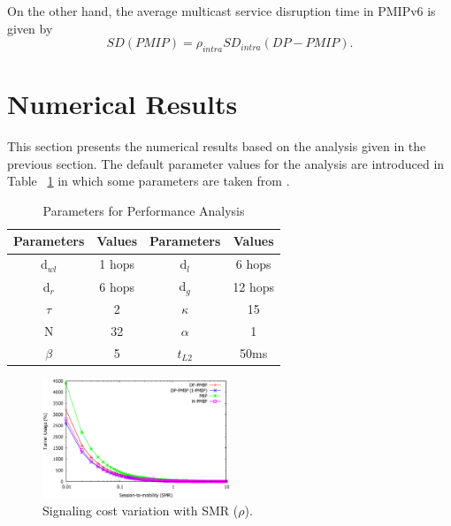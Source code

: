 On the other hand, the average multicast service disruption time in PMIPv6 is given by\\
\begin{equation}
SD(PMIP) = \rho_{intra} SD_{intra}(DP-PMIP). 
\end{equation}

\section{Numerical Results} \label{ch9:numerical_result}
This section presents the numerical results based on the analysis given in the previous section. The default parameter values for the analysis are introduced in Table ~\ref{tap:c9_parameters} in which some parameters are taken from \cite{HO_comparison_Makaya}. \\

\begin{table}[ht]
\caption[Inter-mobility domain solution: Parameters for the performance analysis]{Parameters for Performance Analysis}
\label{tap:c9_parameters}
\centering
\begin{tabular}{|c |c |c |c |}
\hline
Parameters & Values & Parameters & Values\\
\hline
d$_{wl}$ & 1 hops &d$_{l}$ & 6 hops \\
\hline
 d$_{r}$ & 6 hops & d$_{g}$ & 12 hops \\
 \hline
$\tau$ & 2 & $\kappa$ & 15  \\
\hline
N & 32 & $\alpha$ & 1 \\
\hline
$\beta$ & 5  & $t_{L2}$ & 50ms \\
\hline

\end{tabular}
\end{table}

\begin{figure}[h!]
\centering
\includegraphics[width=0.50\textwidth]{./Part3/Chapter7/figures/c9_signaling_cost_smr_6.eps}
\caption[Signaling cost as a function of the session-to-mobility.]{Signaling cost variation with SMR ($\rho$).}
\label{fig:signaling_cost}
\end{figure}

